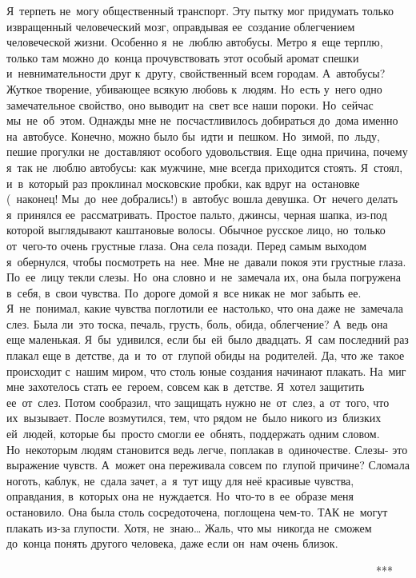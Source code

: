 Я~терпеть не~могу общественный транспорт.
Эту пытку мог придумать только извращенный человеческий мозг, оправдывая ее~создание облегчением человеческой жизни.
Особенно я~не~люблю автобусы.
Метро я~еще терплю, только там можно до~конца прочувствовать этот особый аромат спешки и~невнимательности друг к~другу, свойственный всем городам.
А~автобусы? Жуткое творение, убивающее всякую любовь к~людям.
Но~есть у~него одно замечательное свойство, оно выводит на~свет все наши пороки.
Но~сейчас мы~не~об~этом.
Однажды мне не~посчастливилось добираться до~дома именно на~автобусе.
Конечно, можно было бы~идти и~пешком.
Но~зимой, по~льду, пешие прогулки не~доставляют особого удовольствия.
Еще одна причина, почему я~так не~люблю автобусы: как мужчине, мне всегда приходится стоять.
Я~стоял, и~в~который раз проклинал московские пробки, как вдруг на~остановке (~наконец! Мы~до~нее добрались!) в~автобус вошла девушка.
От~нечего делать я~принялся ее~рассматривать.
Простое пальто, джинсы, черная шапка, из-под которой выглядывают каштановые волосы.
Обычное русское лицо, но~только от~чего-то очень грустные глаза.
Она села позади.
Перед самым выходом я~обернулся, чтобы посмотреть на~нее.
Мне не~давали покоя эти грустные глаза.
По~ее~лицу текли слезы.
Но~она словно и~не~замечала их, она была погружена в~себя, в~свои чувства.
По~дороге домой я~все никак не~мог забыть ее.
Я~не~понимал, какие чувства поглотили ее~настолько, что она даже не~замечала слез.
Была ли~это тоска, печаль, грусть, боль, обида, облегчение? А~ведь она еще маленькая.
Я~бы~удивился, если бы~ей~было двадцать.
Я~сам последний раз плакал еще в~детстве, да~и~то~от~глупой обиды на~родителей.
Да, что же~такое происходит с~нашим миром, что столь юные создания начинают плакать.
На~миг мне захотелось стать ее~героем, совсем как в~детстве.
Я~хотел защитить ее~от~слез.
Потом сообразил, что защищать нужно не~от~слез, а~от~того, что их~вызывает.
После возмутился, тем, что рядом не~было никого из~близких ей~людей, которые бы~просто смогли ее~обнять, поддержать одним словом.
Но~некоторым людям становится ведь легче, поплакав в~одиночестве.
Слезы- это выражение чувств.
А~может она переживала совсем по~глупой причине? Сломала ноготь, каблук, не~сдала зачет, а~я~тут ищу для неё красивые чувства, оправдания, в~которых она не~нуждается.
Но~что-то в~ее~образе меня остановило.
Она была столь сосредоточена, поглощена чем-то.
ТАК не~могут плакать из-за глупости.
Хотя, не~знаю… Жаль, что мы~никогда не~сможем до~конца понять другого человека, даже если он~нам очень близок.
 
~~~~~~~~~~~~~~~~~~~~~~~~~~~~~~~~~~~~~~~~~~~~~~~~~~~~~~~~~~~~~~~~~~***
 
